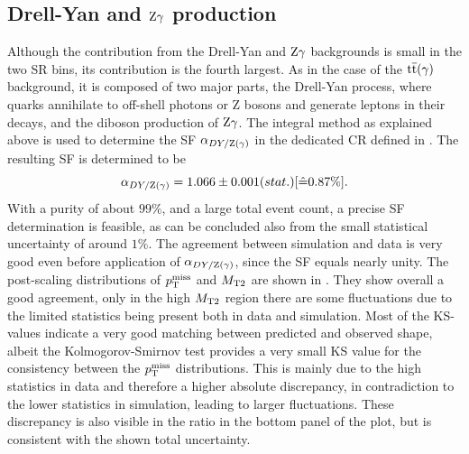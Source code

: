 \subsection{Drell-Yan and $\mathrm{Z}\gamma$ production}
Although the contribution from the Drell-Yan and $\mathrm{Z}\gamma$ backgrounds is small in the two SR bins, its contribution is the fourth largest. As in the case of the ${\mathrm{t}\overline{\mathrm{t}}}(\gamma)$ background, it is composed of two major parts, the Drell-Yan process, where quarks annihilate to off-shell photons or Z bosons and generate leptons in their decays, and the diboson production of $\mathrm{Z}\gamma$. The integral method as explained above is used to determine the SF $\alpha_{DY/\mathrm{Z}(\gamma)}$ in the dedicated CR defined in .
The resulting SF is determined to be
\begin{equation}\label{eq:AlphaDY}
 \alpha_{DY/\mathrm{Z}(\gamma)}=1.066 \pm 0.001 (stat.) [\hat{=}0.87\%].
\end{equation}
With a purity of about $99\%$, and a large total event count, a precise SF determination is feasible, as can be concluded also from the small statistical uncertainty of around $1\%$. The agreement between simulation and data is very good even before application of $\alpha_{DY/\mathrm{Z}(\gamma)}$, since the SF equals nearly unity. The post-scaling distributions of $p_{\mathrm{T}}^\text{miss}$ and $M_{\mathrm{T2}}$ are shown in . They show overall a good agreement, only in the high $M_{\mathrm{T2}}$ region there are some fluctuations due to the limited statistics being present both in data and simulation.
Most of the KS-values indicate a very good matching between predicted and observed shape, albeit the Kolmogorov-Smirnov test provides a very small KS value for the consistency between the $p_{\mathrm{T}}^\text{miss}$ distributions. This is mainly due to the high statistics in data and therefore a higher absolute discrepancy, in contradiction to the lower statistics in simulation, leading to larger fluctuations. These discrepancy is also visible in the ratio in the bottom panel of the plot, but is consistent with the shown total uncertainty.\\
%


